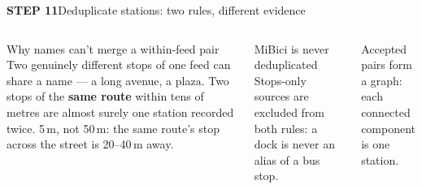 \documentclass[aspectratio=169,10pt]{beamer}
\newcommand{\muted}[1]{{\color{cInkTwo}#1}}
\newcommand{\step}[2]{%
  {\setlength{\fboxsep}{2pt}\colorbox{#1}{\scriptsize\bfseries\color{white}STEP #2}}\hspace{0.4em}}
\begin{document}
\begin{frame}{\step{cPTwo}{11}Deduplicate stations: two rules, different evidence}
\begin{columns}[T]
    \begin{block}{Why names can't merge a within-feed pair}
      \scriptsize Two genuinely different stops of one feed can share a name --- a long avenue, a plaza.
      Two stops of the \textbf{same route} within tens of metres are almost surely one station recorded
      twice. 5\,m, not 50\,m: the same route's stop across the street is 20--40\,m away.
    \end{block}
    \vskip0.2cm
    \begin{exampleblock}{MiBici is never deduplicated}
      \scriptsize Stops-only sources are excluded from both rules: a dock is never an alias of a bus stop.
    \end{exampleblock}
    \vskip0.1cm
    \muted{\scriptsize Accepted pairs form a graph: each connected component is one station.}
  \end{columns}
\end{frame}
\end{document}
